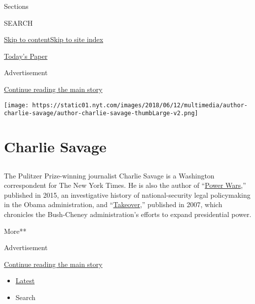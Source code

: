 Sections

SEARCH

\protect\hyperlink{site-content}{Skip to
content}\protect\hyperlink{site-index}{Skip to site index}

\href{https://myaccount.nytimes.com/auth/login?response_type=cookie\&client_id=vi}{}

\href{https://www.nytimes.com/section/todayspaper}{Today's Paper}

Advertisement

\protect\hyperlink{after-top}{Continue reading the main story}

\texttt{[image: https://static01.nyt.com/images/2018/06/12/multimedia/author-charlie-savage/author-charlie-savage-thumbLarge-v2.png]}

\hypertarget{charlie-savage}{%
\section{Charlie Savage}\label{charlie-savage}}

\subsection{}

The Pulitzer Prize-winning journalist Charlie Savage is a Washington
correspondent for The New York Times. He is also the author of
``\href{http://www.nytimes.com/2015/12/20/books/review/charlie-savages-power-wars.html}{Power
Wars},'' published in 2015, an investigative history of
national-security legal policymaking in the Obama administration, and
``\href{http://www.nytimes.com/2007/09/25/books/25kaku.html}{Takeover},''
published in 2007, which chronicles the Bush-Cheney administration's
efforts to expand presidential power.

More**

Advertisement

\protect\hyperlink{after-mid1}{Continue reading the main story}

\begin{itemize}
\tightlist
\item
  \protect\hyperlink{stream-panel}{Latest}
\item
  Search
\end{itemize}

